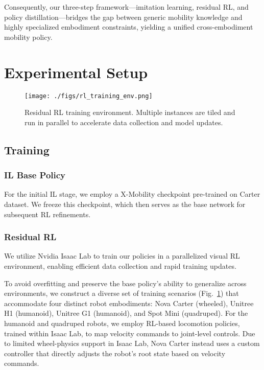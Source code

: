 \documentclass[letterpaper, 10 pt,conference]{ieeeconf}
\begin{document}
Consequently, our three-step framework—imitation learning, residual RL, and policy distillation—bridges the gap between generic mobility knowledge and highly specialized embodiment constraints, yielding a unified cross-embodiment mobility policy.

\section{Experimental Setup} \label{sec:exp-setup}

\begin{figure}[t] 
\begin{center} \centering\texttt{[image: ./figs/rl\_training\_env.png]} 
\caption{Residual RL training environment. Multiple instances are tiled and run in parallel to accelerate data collection and model updates.} \label{fig:residual_rl_training_env} 
\end{center} 
\end{figure}

\subsection{Training}

\subsubsection{IL Base Policy} For the initial IL stage, we employ a X-Mobility checkpoint pre-trained on Carter dataset. We freeze this checkpoint, which then serves as the base network for subsequent RL refinements.

\subsubsection{Residual RL} 

We utilize Nvidia Isaac Lab\cite{mittal2023orbit} to train our policies in a parallelized visual RL environment, enabling efficient data collection and rapid training updates.

To avoid overfitting and preserve the base policy’s ability to generalize across environments, we construct a diverse set of training scenarios (Fig.~\ref{fig:residual_rl_training_env}) that accommodate four distinct robot embodiments: Nova Carter (wheeled), Unitree H1 (humanoid), Unitree G1 (humanoid), and Spot Mini (quadruped). For the humanoid and quadruped robots, we employ RL-based locomotion policies, trained within Isaac Lab, to map velocity commands to joint-level controls. Due to limited wheel-physics support in Isaac Lab, Nova Carter instead uses a custom controller that directly adjusts the robot’s root state based on velocity commands.
\end{document}
